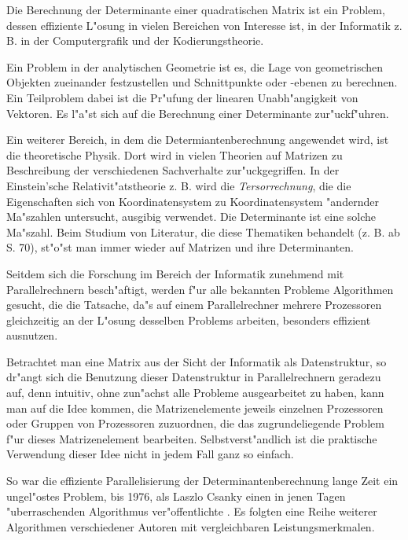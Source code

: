 %
%
\label{ChapIntro}



Die Berechnung der Determinante einer quadratischen Matrix ist ein
Problem,
dessen effiziente L"osung in vielen Bereichen von Interesse ist, in der
Informatik z. B. in der Computergrafik und der Kodierungstheorie.

Ein Problem in der analytischen Geometrie ist es, die 
Lage von geometrischen Objekten zueinander festzustellen und 
Schnittpunkte oder -ebenen zu berechnen. Ein Teilproblem dabei ist die
Pr"ufung der linearen Unabh"angigkeit von Vektoren. Es
l"a"st sich auf die Berechnung einer Determinante zur"uckf"uhren.

Ein weiterer Bereich, in dem die Determiantenberechnung angewendet wird,
ist
die theoretische Physik. Dort wird in vielen Theorien auf Matrizen zu
Beschreibung der verschiedenen Sachverhalte zur"uckgegriffen. In der
Einstein'sche Relativit"atstheorie z. B. wird die {\em Tersorrechnung},
die die Eigenschaften sich von Koordinatensystem zu Koordinatensystem
"andernder Ma"szahlen untersucht, ausgibig verwendet. Die Determinante ist
eine solche Ma"szahl. Beim Studium von Literatur, die diese Thematiken
behandelt (z. B. \cite{BS86} ab S. 70), st"o"st man immer wieder auf
Matrizen und ihre Determinanten.

Seitdem
sich die Forschung im Bereich der Informatik zunehmend mit 
Parallelrechnern
be\-sch"af\-tigt, werden f"ur alle bekannten Probleme Algorithmen gesucht, 
die die Tatsache, da"s auf einem Parallelrechner mehrere Prozessoren 
gleichzeitig an der L"osung desselben Problems arbeiten, besonders 
effizient ausnutzen.

Betrachtet man eine Matrix aus der Sicht der Informatik als Datenstruktur,
so dr"angt sich die Benutzung dieser Datenstruktur in Parallelrechnern 
geradezu auf, denn intuitiv, ohne zun"achst alle Probleme ausgearbeitet 
zu haben, kann man auf die Idee kommen, die Matrizenelemente jeweils
einzelnen Prozessoren oder Gruppen von Prozessoren zuzuordnen, die das 
zugrundeliegende Problem f"ur dieses Matrizenelement bearbeiten. 
Selbstverst"andlich ist die praktische Verwendung dieser Idee nicht in 
jedem Fall ganz so einfach.

So war die effiziente Parallelisierung der Determinantenberechnung lange
Zeit ein ungel"ostes Problem, bis 1976, als Laszlo Csanky einen in jenen 
Tagen "uberraschenden Algorithmus ver"offentlichte \cite{Csan76}. Es 
folgten eine Reihe weiterer Algorithmen verschiedener Autoren mit 
vergleichbaren Leistungsmerkmalen.

